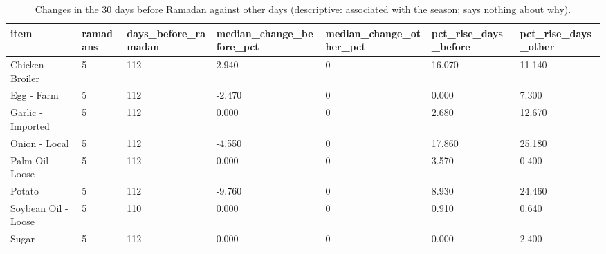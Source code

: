 \begin{table}
\caption{Changes in the 30 days before Ramadan against other days (descriptive: associated with the season; says nothing about why).}
\label{tab:r3}
\begin{tabular}{lllllll}
\toprule
item & ramadans & days\_before\_ramadan & median\_change\_before\_pct & median\_change\_other\_pct & pct\_rise\_days\_before & pct\_rise\_days\_other \\
\midrule
Chicken - Broiler & 5 & 112 & 2.940 & 0 & 16.070 & 11.140 \\
Egg - Farm & 5 & 112 & -2.470 & 0 & 0.000 & 7.300 \\
Garlic - Imported & 5 & 112 & 0.000 & 0 & 2.680 & 12.670 \\
Onion - Local & 5 & 112 & -4.550 & 0 & 17.860 & 25.180 \\
Palm Oil - Loose & 5 & 112 & 0.000 & 0 & 3.570 & 0.400 \\
Potato & 5 & 112 & -9.760 & 0 & 8.930 & 24.460 \\
Soybean Oil - Loose & 5 & 110 & 0.000 & 0 & 0.910 & 0.640 \\
Sugar & 5 & 112 & 0.000 & 0 & 0.000 & 2.400 \\
\bottomrule
\end{tabular}
\end{table}
